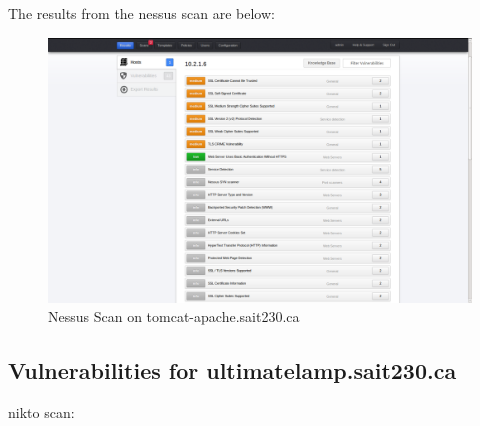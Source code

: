\documentclass{article}
\begin{document}
The results from the nessus scan are below:

\begin{figure}[h!]
	\includegraphics[width=\linewidth]{images/nessus-tomcat.png}
	\caption{Nessus Scan on tomcat-apache.sait230.ca}
	\label{fig:nessus-tomcat}
\end{figure}

\subsection{Vulnerabilities for ultimatelamp.sait230.ca}
nikto scan:
\end{document}
